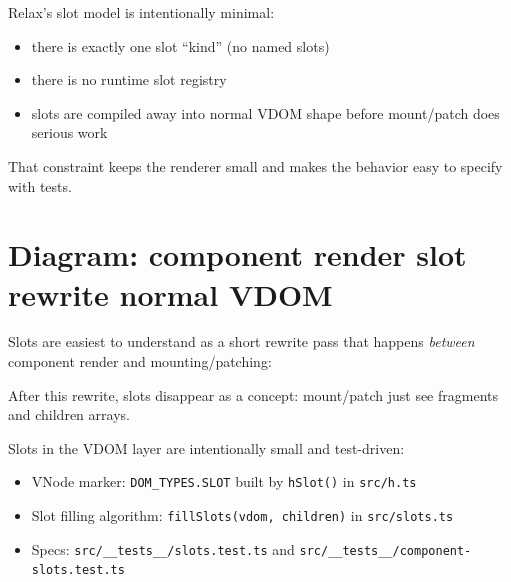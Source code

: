 Relax’s slot model is intentionally minimal:

\begin{itemize}
  \item there is exactly one slot ``kind'' (no named slots)
  \item there is no runtime slot registry
  \item slots are compiled away into normal VDOM shape before mount/patch does serious work
\end{itemize}

That constraint keeps the renderer small and makes the behavior easy to specify with tests.

\section{Diagram: component render \textrightarrow slot rewrite \textrightarrow normal VDOM}
Slots are easiest to understand as a short rewrite pass that happens \emph{between} component render and mounting/patching:

\begin{center}
\end{center}

After this rewrite, slots disappear as a concept: mount/patch just see fragments and children arrays.

Slots in the VDOM layer are intentionally small and test-driven:

\begin{itemize}
  \item VNode marker: \texttt{DOM\_TYPES.SLOT} built by \texttt{hSlot()} in \texttt{src/h.ts}
  \item Slot filling algorithm: \texttt{fillSlots(vdom, children)} in \texttt{src/slots.ts}
  \item Specs: \texttt{src/\_\_tests\_\_/slots.test.ts} and \texttt{src/\_\_tests\_\_/component-slots.test.ts}
\end{itemize}

